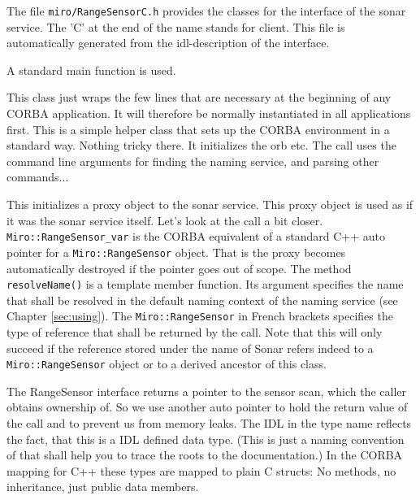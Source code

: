 

The file \lstinline!miro/RangeSensorC.h! provides the classes for the interface of the
sonar service. The 'C' at the end of the name stands for client. This
file is automatically generated from the idl-description of the interface.



A standard main function is used.



This class just wraps the few lines that are necessary at the beginning of any CORBA
application. It will therefore be normally instantiated in all \miro
applications first. This is a simple helper class that sets up the
CORBA environment in a standard way. Nothing tricky there.  It
initializes the orb etc. The call uses the command line arguments for
finding the naming service, and parsing other commands...



This initializes a proxy object to the sonar service. This proxy
object is used as if it was the sonar service itself. Let's look
at the call a bit closer. \lstinline!Miro::RangeSensor_var! is the
CORBA equivalent of a standard C++ auto pointer for a
\lstinline!Miro::RangeSensor! object. That is the proxy becomes
automatically destroyed if the pointer goes out of scope. The
method {\tt resolveName()} is a template member function. Its
argument specifies the name that shall be resolved in the default
naming context of the naming service (see Chapter
\ref{sec:using}). The \lstinline!Miro::RangeSensor! in French
brackets specifies the type of reference that shall be returned by
the call. Note that this will only succeed if the reference stored
under the name of Sonar refers indeed to a {\tt Miro::RangeSensor}
object or to a derived ancestor of this class.



The RangeSensor interface returns a pointer to the sensor scan, which
the caller obtains ownership of. So we use another auto pointer to
hold the return value of the call and to prevent us from memory leaks.
The IDL in the type name reflects the fact, that this is a IDL defined
data type. (This is just a naming convention of \miro that shall help
you to trace the roots to the documentation.) In the CORBA mapping for
C++ these types are mapped to plain C structs: No methods, no
inheritance, just public data members.

